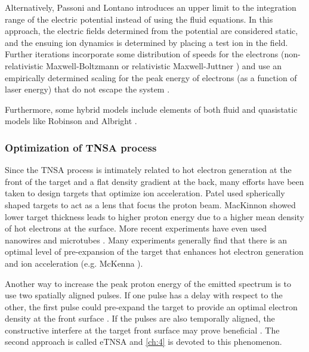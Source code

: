 Alternatively, Passoni and Lontano \cite{Passoni_2004_LaPB} introduces an upper limit to the integration range of the electric potential instead of using the fluid equations. In this approach, the electric fields determined from the potential are considered static, and the ensuing ion dynamics is determined by placing a test ion in the field. Further iterations incorporate some distribution of speeds for the electrons (non-relativistic Maxwell-Boltzmann \cite{Lontano_2006_PoP} or relativistic Maxwell-Juttner \cite{Passoni_2008_PRL}) and use an empirically determined scaling for the peak energy of electrons (as a function of laser energy) that do not escape the system \cite{Perego_2012_RevSci}.

Furthermore, some hybrid models include elements of both fluid and quasistatic models like Robinson \cite{Robinson_2006_PRL} and Albright \cite{Albright_2006_PRL}.

\subsubsection{Optimization of TNSA process} \label{sec:tnsa_opt}

Since the \gls{TNSA} process is intimately related to hot electron generation at the front of the target and a flat density gradient at the back, many efforts have been taken to design targets that optimize ion acceleration. Patel \cite{Patel_2003_PRL} used spherically shaped targets to act as a lens that focus the proton beam. MacKinnon \cite{Mackinnon_2002_PRL} showed lower target thickness leads to higher proton energy due to a higher mean density of hot electrons at the surface. More recent experiments have even used nanowires \cite{Vallieres_2021_Nature} and microtubes \cite{Strehlow_2022_Nature}. Many experiments generally find that there is an optimal level of pre-expansion of the target that enhances hot electron generation and ion acceleration (e.g. McKenna \cite{McKenna_2008_LaPB}).

Another way to increase the peak proton energy of the emitted spectrum is to use two spatially aligned pulses. If one pulse has a delay with respect to the other, the first pulse could pre-expand the target to provide an optimal electron density at the front surface \cite{Ferri_2018_PoP}. If the pulses are also temporally aligned, the constructive interfere at the target front surface may prove beneficial \cite{Ferri_2019_Nat_Comm}. The second approach is called \gls{eTNSA} and \cref{ch:4} is devoted to this phenomenon. 

